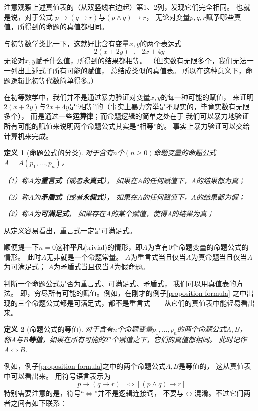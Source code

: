 \documentclass[a4paper, 11pt]{article} %
\newcommand*{\vs}{\vspace{5pt}}
\newtheorem{definition}{定义}[subsection]
\begin{document}
注意观察上述真值表的（从双竖线右边起）第1、2列，发现它们完全相同。
也就是说，对于公式
$p\rightarrow (q\rightarrow r)$与$(p\wedge q)\rightarrow r$，
无论对变量$p,q,r$赋予哪些真值，所得到的命题的真值都相同。

与初等数学类比一下，这就好比含有变量$x,y$的两个表达式
$$2(x+2y)\,\,\,\,,\,\,\,\,2x+4y$$
无论对$x,y$赋予什么值，所得到的结果都相等。
（但实数有无限多个，我们无法一一列出上述式子所有可能的赋值，
总结成类似的真值表。
所以在这种意义下，命题逻辑比初等代数简单得多。）\vs

在初等数学中，我们并不是通过暴力验证对变量$x,y$的每一种可能的赋值，
来证明$2(x+2y)$与$2x+4y$是“相等”的（事实上暴力穷举是不现实的，毕竟实数有无限多个），
而是通过一些\textbf{运算律}；而命题逻辑的简单之处在于
我们可以暴力地验证所有可能的赋值来说明两个命题公式其实是“相等”的。
事实上暴力验证可以交给计算机来完成。

\begin{definition}[命题公式的分类]
对于含有$n$个$(n\geq0)$命题变量的命题公式$A=A(p_1,...,p_n)$，

（1）称$A$为\textbf{重言式}（或者\textbf{永真式}），
如果在$A$的任何赋值下，$A$的结果都为真；

（2）称$A$为\textbf{矛盾式}（或者\textbf{永假式}），
如果在$A$的任何赋值下，$A$的结果都为假；

（2）称$A$为\textbf{可满足式}，
如果存在$A$的某个赋值，使得$A$的结果为真；
\end{definition}

从定义容易看出，重言式一定是可满足式。

顺便提一下$n=0$这种\textbf{平凡}(trivial)的情形，即$A$为含有0个命题变量的命题公式的情形。
此时$A$无非就是一个命题常量。
$A$为重言式当且仅当$A$为真命题当且仅当$A$为可满足式；
$A$为矛盾式当且仅当$A$为假命题。\vs

判断一个命题公式是否为重言式、可满足式、矛盾式，
我们可以用真值表的方法。
即，穷尽所有可能的赋值。例如，在刚才的例子\ref{proposition formula}
之中出现的三个命题公式都是可满足式，都不是重言式——从它们的真值表中能轻易看出来。

\begin{definition}[命题公式的等值]
对于含有$n$个命题变量$p_1,...,p_n$的两个命题公式$A,B$，
称$A$与$B$\textbf{等值}，如果在所有可能的$2^n$个赋值之下，它们的真值都相同。
此时记作$A\Leftrightarrow B$.
\end{definition}
例如，例子\ref{proposition formula}之中的两个命题公式$A,B$是等值的，
这从真值表中可以看出来。
用符号语言表示为
$$[p\rightarrow (q\rightarrow r)]
\Leftrightarrow [(p\wedge q)\rightarrow r]$$
特别需要注意的是，符号“$\Leftrightarrow$”并不是逻辑连接词，
不要与$\leftrightarrow$混淆。不过它们两者之间有如下联系：
\end{document}
